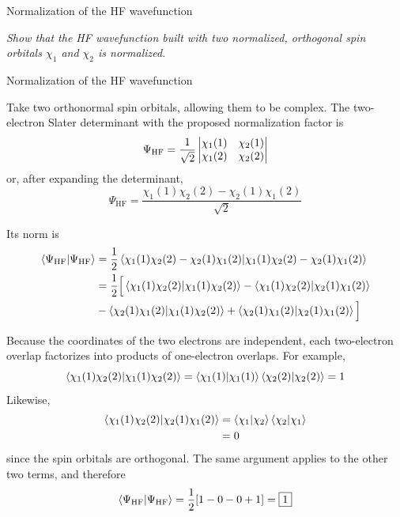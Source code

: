 \documentclass[11pt,a4paper,titlepage]{article}
\numberwithin{equation}{section}
\newcommand{\violet}[1]{\textcolor{hfViolet}{#1}}
\begin{document}
\begin{hfexercise}{Normalization of the HF wavefunction}

\violet{\textit{Show that the HF wavefunction built with two normalized,
orthogonal spin orbitals $\chi_1$ and $\chi_2$ is normalized.}}

\end{hfexercise}
\begin{hfsolution}{Normalization of the HF wavefunction}

Take two orthonormal spin orbitals, allowing them to be complex. The
two-electron Slater determinant with the proposed normalization factor is
\begin{equation}
  \Psi_\text{HF}
  =
  \frac{1}{\sqrt{2}}
  \mdet{
    \chi_1(1) & \chi_2(1)\\
    \chi_1(2) & \chi_2(2)
  }
\end{equation}
or, after expanding the determinant,
\begin{equation}
  \Psi_\text{HF}
  =
  \frac{
    \chi_1(1)\chi_2(2)
    -
    \chi_2(1)\chi_1(2)
  }{\sqrt{2}}
  \label{eq:two-electron-determinant-example}
\end{equation}

Its norm is
\begin{equation}
\begin{split}
  \braket{\Psi_\text{HF}}{\Psi_\text{HF}}
  &=
  \frac{1}{2}
  \braket{
    \chi_1(1)\chi_2(2)-\chi_2(1)\chi_1(2)
  }{
    \chi_1(1)\chi_2(2)-\chi_2(1)\chi_1(2)
  }
  \\
  &=
  \frac{1}{2}
  \Big[
    \braket{\chi_1(1)\chi_2(2)}
            {\chi_1(1)\chi_2(2)}
    -
    \braket{\chi_1(1)\chi_2(2)}
            {\chi_2(1)\chi_1(2)}
  \\
  &
    -
    \braket{\chi_2(1)\chi_1(2)}
            {\chi_1(1)\chi_2(2)}
    +
    \braket{\chi_2(1)\chi_1(2)}
            {\chi_2(1)\chi_1(2)}
  \Big]
  \label{eq:two-electron-norm-expansion}
\end{split}
\end{equation}

Because the coordinates of the two electrons are independent, each
two-electron overlap factorizes into products of one-electron overlaps.
For example,
\begin{equation}
  \braket{\chi_1(1)\chi_2(2)}
          {\chi_1(1)\chi_2(2)}
  =
  \braket{\chi_1(1)}{\chi_1(1)}
  \braket{\chi_2(2)}{\chi_2(2)}
  =
  1
\end{equation}
Likewise,
\begin{equation}
\begin{split}
  \braket{\chi_1(1)\chi_2(2)}
          {\chi_2(1)\chi_1(2)}
  &=
  \braket{\chi_1}{\chi_2}
  \braket{\chi_2}{\chi_1}
  \\
  &=0
\end{split}
\end{equation}
since the spin orbitals are orthogonal. The same argument applies to the
other two terms, and therefore
\begin{equation}
  \braket{\Psi_\text{HF}}{\Psi_\text{HF}}
  =
  \frac{1}{2}[1-0-0+1]
  =
  \boxed{1}
\end{equation}


\end{hfsolution}
\end{document}
